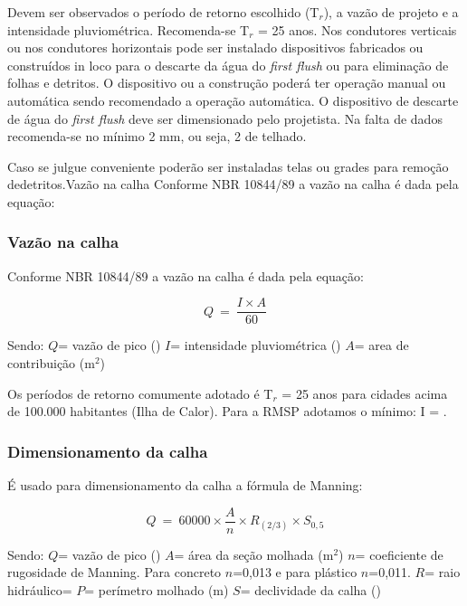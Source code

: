	Devem ser observados o período de retorno escolhido (T$_{r}$), a vazão de projeto e a intensidade pluviométrica. Recomenda-se T$_{r}$ = 25 anos. Nos condutores verticais ou nos condutores horizontais pode ser instalado dispositivos fabricados ou construídos in loco para o descarte da água do \textit{first flush} ou para eliminação de folhas e detritos. O dispositivo ou a construção poderá ter operação manual ou automática sendo recomendado a operação automática. O dispositivo de descarte de água do \textit{first flush} deve ser dimensionado pelo projetista. Na falta de dados recomenda-se no mínimo 2 \si{\milli\meter}, ou seja, 2  de telhado.

	Caso se julgue conveniente poderão ser instaladas telas ou grades para remoção dedetritos.Vazão na calha
Conforme NBR 10844/89 a vazão na calha é dada pela equação:

\subsubsection{Vazão na calha}

	Conforme NBR 10844/89 a vazão na calha é dada pela equação:

$$Q\ =\ \dfrac{I\times A}{60}$$

	Sendo:
$Q$= vazão de pico ()
$I$= intensidade pluviométrica (\nicefrac{\si{\milli\meter}}{\si{\hour}})
$A$= area de contribuição ($\si{\meter}^{2}$)

Os períodos de retorno comumente adotado é T$_{r}$ = 25 anos para cidades acima de 100.000 habitantes (Ilha de Calor). Para a RMSP adotamos o mínimo: I = \nicefrac{200\si{\milli\meter}}{\si{\hour}}.

\subsubsection{Dimensionamento da calha}

É usado para dimensionamento da calha a fórmula de Manning:

$$Q\ =\ 60000\times \dfrac{A}{n}\times R_{(2/3)} \times S_{0,5}$$

Sendo:
$Q$= vazão de pico ()
$A$= área da seção molhada ($\si{\meter}^{2}$)
$n$= coeficiente de rugosidade de Manning. Para concreto $n$=0,013 e para plástico $n$=0,011.
$R$= raio hidráulico= 
$P$= perímetro molhado (\si{\meter})
$S$= declividade da calha (\nicefrac{\si{\meter}}{\si{\meter}})

